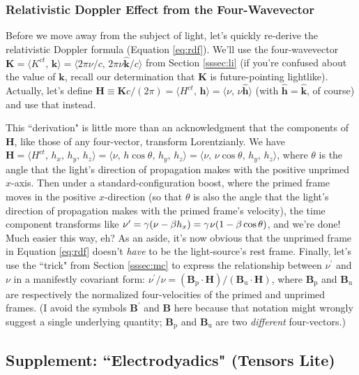 \documentclass[12pt]{article}
\renewcommand{\vv}[1]{\mathbf{#1}}
\begin{document}
\subsubsection{Relativistic Doppler Effect from the Four-Wavevector}

Before we move away from the subject of light, let's quickly re-derive the relativistic Doppler formula (Equation \ref{eq:rdf}). We'll use the four-wavevector ${\vv K = \langle K^{ct}, \, \vv k \rangle = \langle 2 \pi \nu / c, \, 2 \pi \nu \vv{\hat{k}} / c \rangle }$ from Section \ref{sssec:li} (if you're confused about the value of $\vv k$, recall our determination that $\vv K$ is future-pointing lightlike). Actually, let's define ${\vv H \equiv \vv K c / (2 \pi) = \langle H^{ct}, \, \vv h \rangle = \langle \nu, \, \nu \vv{\hat{h}} \rangle }$ (with $\vv{\hat{h}} = \vv{\hat{k}}$, of course) and use that instead.

This ``derivation" is little more than an acknowledgment that the components of $\vv H$, like those of any four-vector, transform Lorentzianly. We have ${\vv H = \langle H^{ct}, \, h_x, \, h_y, \, h_z \rangle = \langle \nu , \, h \cos \theta, \, h_y, \, h_z \rangle = \langle \nu , \, \nu \cos \theta, \, h_y, \, h_z \rangle}$, where $\theta$ is the angle that the light's direction of propagation makes with the positive unprimed $x$-axis. Then under a standard-configuration boost, where the primed frame moves in the positive $x$-direction (so that $\theta$ is also the angle that the light's direction of propagation makes with the primed frame's velocity), the time component transforms like $\nu ^{\prime} = \gamma (\nu - \beta h_x ) = \gamma \mkern1mu \nu (1 - \beta \cos \theta)$, and we're done! Much easier this way, eh? As an aside, it's now obvious that the unprimed frame in Equation \ref{eq:rdf} doesn't \emph{have} to be the light-source's rest frame. Finally, let's use the ``trick" from Section \ref{sssec:mc} to express the relationship between $\nu ^{\prime}$ and $\nu$ in a manifestly covariant form: $\nu ^{\prime} / \nu = (\vv B_{\textrm{p}} \cdot \vv H) / (\vv B_{\textrm{u}} \cdot \vv H)$, where $\vv B_{\textrm{p}}$ and $\vv B_{\textrm{u}}$ are respectively the normalized four-velocities of the primed and unprimed frames. (I avoid the symbols $\vv B ^{\prime}$ and $\vv B$ here because that notation might wrongly suggest a single underlying quantity; $\vv B_{\textrm{p}}$ and $\vv B_{\textrm{u}}$ are two \emph{different} four-vectors.)


\subsection[Supplement: "Electrodyadics" (Tensors Lite)]{Supplement: ``Electrodyadics" (Tensors Lite)}\label{ssec:dy}
\end{document}
